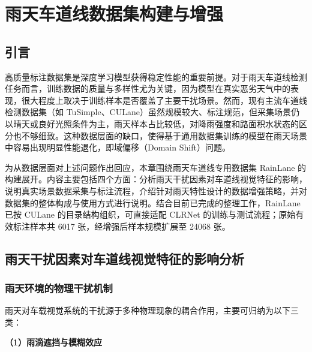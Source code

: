 \chapter{雨天车道线数据集构建与增强}
\label{cha:dataset_construction}

\section{引言}
\label{sec:intro_3}

高质量标注数据集是深度学习模型获得稳定性能的重要前提。对于雨天车道线检测任务而言，训练数据的质量与多样性尤为关键，因为模型在真实恶劣天气中的表现，很大程度上取决于训练样本是否覆盖了主要干扰场景。然而，现有主流车道线检测数据集（如 TuSimple\cite{tusimple}、CULane\cite{pan2018spatial}）虽然规模较大、标注规范，但采集场景仍以晴天或良好光照条件为主，雨天样本占比较低，对降雨强度和路面积水状态的区分也不够细致。这种数据层面的缺口，使得基于通用数据集训练的模型在雨天场景中容易出现明显性能退化，即域偏移（Domain Shift）问题\cite{porav2019}。

为从数据层面对上述问题作出回应，本章围绕雨天车道线专用数据集 RainLane 的构建展开。内容主要包括四个方面：分析雨天干扰因素对车道线视觉特征的影响，说明真实场景数据采集与标注流程，介绍针对雨天特性设计的数据增强策略，并对数据集的整体构成与使用方式进行说明。结合目前已完成的整理工作，RainLane 已按 CULane 的目录结构组织，可直接适配 CLRNet 的训练与测试流程；原始有效标注样本共 6017 张，经增强后样本规模扩展至 24068 张。


\section{雨天干扰因素对车道线视觉特征的影响分析}
\label{sec:rain_impact_analysis}

\subsection{雨天环境的物理干扰机制}

雨天对车载视觉系统的干扰源于多种物理现象的耦合作用，主要可归纳为以下三类：

\textbf{（1）雨滴遮挡与模糊效应}

